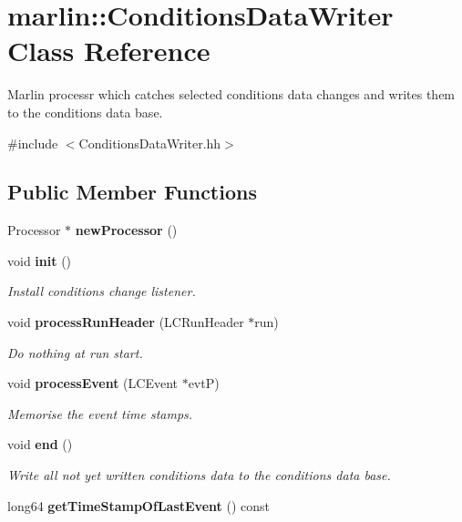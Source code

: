 \section{marlin::ConditionsDataWriter Class Reference}
\label{classmarlin_1_1ConditionsDataWriter}


Marlin processr which catches selected conditions data changes and writes them to the conditions data base.  


{\ttfamily \#include $<$ConditionsDataWriter.hh$>$}\subsection*{Public Member Functions}
\begin{DoxyCompactItemize}
\item 
Processor $\ast$ {\bfseries newProcessor} ()\label{classmarlin_1_1ConditionsDataWriter_a360478d5d28f2e5012ef5e0e5201821a}

\item 
void {\bf init} ()
\begin{DoxyCompactList}\small\item\em Install conditions change listener. \item\end{DoxyCompactList}\item 
void {\bf processRunHeader} (LCRunHeader $\ast$run)\label{classmarlin_1_1ConditionsDataWriter_a943dd58f7e315e2ded7f49a77211eb82}

\begin{DoxyCompactList}\small\item\em Do nothing at run start. \item\end{DoxyCompactList}\item 
void {\bf processEvent} (LCEvent $\ast$evtP)
\begin{DoxyCompactList}\small\item\em Memorise the event time stamps. \item\end{DoxyCompactList}\item 
void {\bf end} ()
\begin{DoxyCompactList}\small\item\em Write all not yet written conditions data to the conditions data base. \item\end{DoxyCompactList}\item 
long64 {\bfseries getTimeStampOfLastEvent} () const \label{classmarlin_1_1ConditionsDataWriter_a8c8683f0e6055c27c991a6f31d5d69a9}

\end{DoxyCompactItemize}
